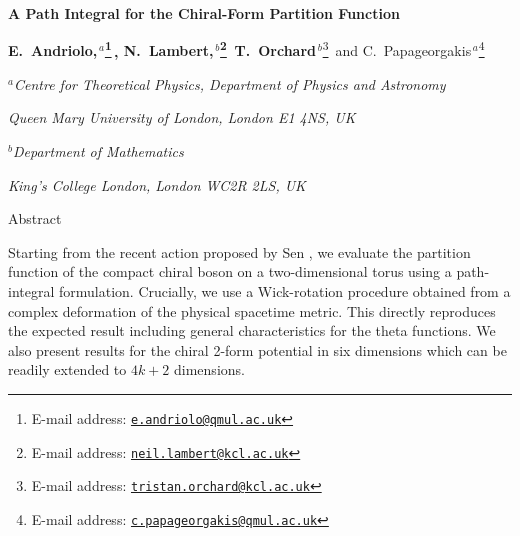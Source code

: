 \documentclass[11pt]{article}
\numberwithin{equation}{section}
\begin{document}
\renewcommand{\thefootnote}{\fnsymbol{footnote}}
 

   \vspace{1.8truecm}
 

 
 \centerline{\LARGE \bf {\sc A Path Integral for the Chiral-Form Partition Function}}
 
 \vspace{1cm}
 
 
 \centerline{
   {\large {\bf {\sc E.~Andriolo,$^{\,a}$}\footnote{E-mail address: \href{mailto:e.andriolo@qmul.ac.uk}{\tt e.andriolo@qmul.ac.uk}}\,, {\sc N.~Lambert,$^{\,b}$}\footnote{E-mail address: \href{mailto:neil.lambert@kcl.ac.uk}{\tt neil.lambert@kcl.ac.uk}}\, {\sc T.~Orchard${}^{\,b}$}}\footnote{E-mail address: \href{mailto:tristan.orchard@kcl.ac.uk}{\tt tristan.orchard@kcl.ac.uk}}\, {\sc and C.~Papageorgakis$^{\,a}$}\footnote{E-mail address: \href{mailto:c.papageorgakis@qmul.ac.uk}{\tt c.papageorgakis@qmul.ac.uk}}} }
   
 

\vspace{1cm}
\centerline{${}^a${\it Centre for Theoretical Physics,  Department of Physics and Astronomy}} 
\centerline{{\it Queen Mary University of London,  London E1 4NS, UK}} 
\vskip 1cm
\centerline{${}^b${\it Department of Mathematics}}
\centerline{{\it King's College London, London WC2R 2LS, UK}} 

\vspace{1.0truecm}

 
\thispagestyle{empty}

\centerline{\sc Abstract}
\vspace{0.4truecm}
\begin{center}
\begin{minipage}[c]{360pt}{Starting from the recent action  proposed by Sen \cite{Sen:2015nph,Sen:2019qit}, we evaluate the partition function of the compact chiral boson on a two-dimensional torus using a path-integral formulation. Crucially,  we use a Wick-rotation procedure obtained from a complex deformation of the physical spacetime metric. This directly reproduces the expected result including general characteristics for the theta functions. We also present results for the chiral 2-form potential in six dimensions which can be readily extended to $4k+2$ dimensions.}
\end{minipage}
\end{center}
\renewcommand{\thefootnote}{\arabic{footnote}}
\setcounter{footnote}{0}
\newpage 
\tableofcontents
\end{document}
